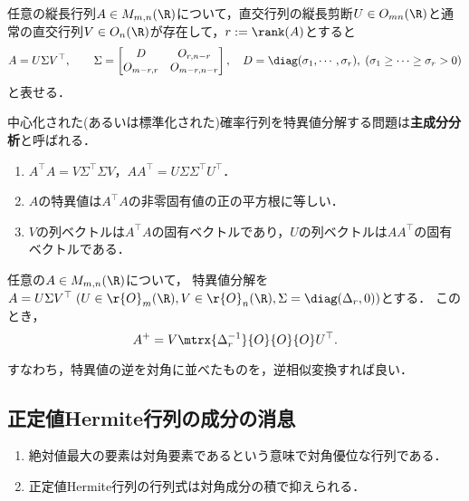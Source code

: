 \documentclass[uplatex, dvipdfmx]{jsreport}
\begin{document}
\begin{proposition}
    任意の縦長行列$A\in M_{m,n}(\R)$について，直交行列の縦長剪断$U\in O_{mn}(\R)$と通常の直交行列$V\in O_n(\R)$が存在して，$r:=\rank(A)$とすると
    \[A=U\Sigma V^\top,\qquad\Sigma=\begin{bmatrix}D&O_{r,n-r}\\O_{m-r,r}&O_{m-r,n-r}\end{bmatrix},\quad D=\diag(\sigma_1,\cdots,\sigma_r),\;(\sigma_1\ge\cdots\ge\sigma_r>0)\]
    と表せる．
\end{proposition}
\begin{remarks}
    中心化された(あるいは標準化された)確率行列を特異値分解する問題は\textbf{主成分分析}と呼ばれる．
\end{remarks}

\begin{corollary}\mbox{}
    \begin{enumerate}
        \item $A^\top A=V\Sigma^\top\Sigma V$，$AA^\top=U\Sigma\Sigma^\top U^\top$．
        \item $A$の特異値は$A^\top A$の非零固有値の正の平方根に等しい．
        \item $V$の列ベクトルは$A^\top A$の固有ベクトルであり，$U$の列ベクトルは$AA^\top$の固有ベクトルである．
    \end{enumerate}
\end{corollary}

\begin{theorem}
    任意の$A\in M_{m,n}(\R)$について，
    特異値分解を$A=U\Sigma V^\top\;(U\in\r{O}_m(\R),V\in\r{O}_n(\R),\Sigma=\diag(\Delta_r,0))$とする．
    このとき，
    \[A^+=V\mtrx{\Delta_r^{-1}}{O}{O}{O}U^\top.\]
\end{theorem}
\begin{remarks}
    すなわち，特異値の逆を対角に並べたものを，逆相似変換すれば良い．
\end{remarks}

\subsection{正定値Hermite行列の成分の消息}

\begin{tcolorbox}[colframe=ForestGreen, colback=ForestGreen!10!white,breakable,colbacktitle=ForestGreen!40!white,coltitle=black,fonttitle=\bfseries\sffamily,
title=]
    \begin{enumerate}
        \item 絶対値最大の要素は対角要素であるという意味で対角優位な行列である．
        \item 正定値Hermite行列の行列式は対角成分の積で抑えられる．
    \end{enumerate}
\end{tcolorbox}
\end{document}
